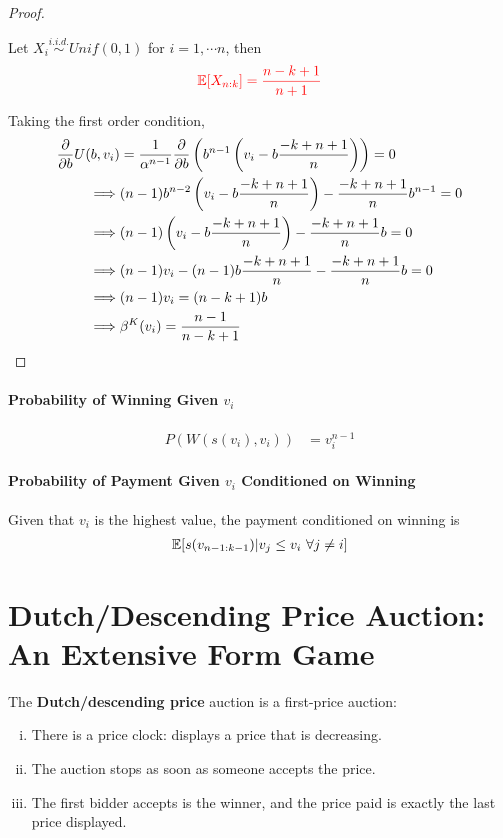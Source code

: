 \documentclass{article}
\begin{document}
\begin{proof}
		\begin{proposition}
			Let $X_i \overset{i.i.d.}{\sim} Unif(0, 1)$ for $i = 1, \cdots n$, then
			\begin{align}
				\textcolor{red}{\mathbb{E}[{X_{n:k}}] = \frac{n-k+1}{n+1}}
			\end{align}
		\end{proposition}
		
		Taking the first order condition,
		\begin{align}
			\frac{\partial{}}{\partial{b}} U(b, v_i) &= \frac{1}{\alpha^{n-1}}
			\frac{\partial{}}{\partial{b}} \left(
			b^{n-1} \left(
			v_i - b \frac{-k+n+1}{n}
			\right)
			\right) = 0 \\
			\implies
			&(n-1)b^{n-2}
			\left(
			v_i - b \frac{-k+n+1}{n}
			\right)
			- \frac{-k+n+1}{n} b^{n-1} = 0 \\
			\implies
			&(n-1)
			\left(
			v_i - b \frac{-k+n+1}{n}
			\right)
			- \frac{-k+n+1}{n} b = 0 \\
			\implies
			&(n-1)
			v_i - (n-1) b \frac{-k+n+1}{n}
			- \frac{-k+n+1}{n} b = 0 \\
			\implies &(n-1)v_i = (n-k+1)b \\
			\implies &\beta^K(v_i) = \frac{n-1}{n-k+1}
		\end{align}
	\end{proof}
	
	\paragraph{Probability of Winning Given $v_i$}
	\begin{align}
		P(W(s(v_i), v_i)) &= v_i^{n-1}
	\end{align}
	
	\paragraph{Probability of Payment Given $v_i$ Conditioned on Winning} Given that $v_i$ is the highest value, the payment conditioned on winning is
	\begin{align}
		\mathbb{E}[{s(v_{n-1:k-1})|v_j \leq v_i\ \forall j \neq i}]
	\end{align}
	
	\section{Dutch/Descending Price Auction: An Extensive Form Game}
	\begin{definition}
		The \textbf{Dutch/descending price} auction is a first-price auction:
		\begin{enumerate}[(i)]
			\item There is a price clock: displays a price that is decreasing.
			\item The auction stops as soon as someone accepts the price.
			\item The first bidder accepts is the winner, and the price paid is exactly the last price displayed.
		\end{enumerate}
	\end{definition}
\end{document}
